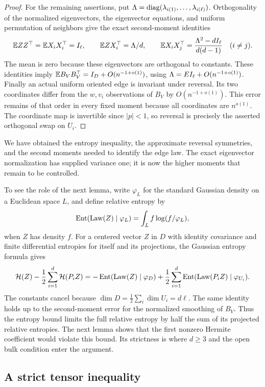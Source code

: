 \begin{proof}
For the remaining assertions, put
\(\Lambda=\operatorname{diag}(\lambda_{i(1)},\ldots,\lambda_{i(\ell)})\).
Orthogonality of the normalized eigenvectors, the eigenvector
equations, and uniform permutation of neighbors give the exact
second-moment identities
\[
 \mathbb E ZZ^\top=\mathbb E X_iX_i^\top=I_\ell,\qquad
 \mathbb E ZX_i^\top=\Lambda/d,\qquad
 \mathbb E X_iX_j^\top=\frac{\Lambda^2-dI_\ell}{d(d-1)}
 \quad(i\ne j).
\]
The mean is zero because these eigenvectors are orthogonal to
constants. These identities imply
\(\mathbb E B_VB_V^\top=I_D+O(n^{-1+o(1)})\), using
\(\Lambda=EI_\ell+O(n^{-1+o(1)})\).
Finally an actual uniform oriented edge is invariant under reversal.
Its two coordinates differ from the \(w,v_i\) observations of \(B_V\)
by \(O(n^{-1+o(1)})\). This error remains of that order in every
fixed moment because all coordinates are \(n^{o(1)}\).
The coordinate map is invertible since \(|p|<1\), so reversal
is precisely the asserted orthogonal swap on \(U_i\).
\end{proof}

We have obtained the entropy inequality, the approximate reversal
symmetries, and the second moments needed to identify the edge law.
The exact eigenvector normalization has supplied variance one; it is
now the higher moments that remain to be controlled.

To see the role of the next lemma, write
\(\varphi_L\) for the standard Gaussian density on a Euclidean space
\(L\), and define relative entropy by
\[
 \operatorname{Ent}(\operatorname{Law}(Z)\mid\varphi_L)
 =\int_L f\log(f/\varphi_L),
\]
when \(Z\) has density \(f\). For a centered vector \(Z\) in \(D\)
with identity covariance and finite differential entropies for itself
and its projections, the Gaussian entropy formula gives
\begin{equation}\label{eq:ent-deficit-sign}
 \mathcal H(Z)-\frac12\sum_{i=1}^d\mathcal H(P_iZ)
 =-\operatorname{Ent}(\operatorname{Law}(Z)\mid\varphi_D)
   +\frac12\sum_{i=1}^d
        \operatorname{Ent}(\operatorname{Law}(P_iZ)\mid\varphi_{U_i}).
\end{equation}
The constants cancel because
\(\dim D=\frac12\sum_i\dim U_i=d\ell\).
The same identity holds up to the second-moment error for the normalized
smoothing of \(B_V\). Thus the entropy bound limits the full relative
entropy by half the sum of its projected relative entropies.
The next lemma shows that the first nonzero Hermite coefficient would
violate this bound. Its strictness is where \(d\ge3\) and the open bulk
condition enter the argument.

\subsection{A strict tensor inequality}

